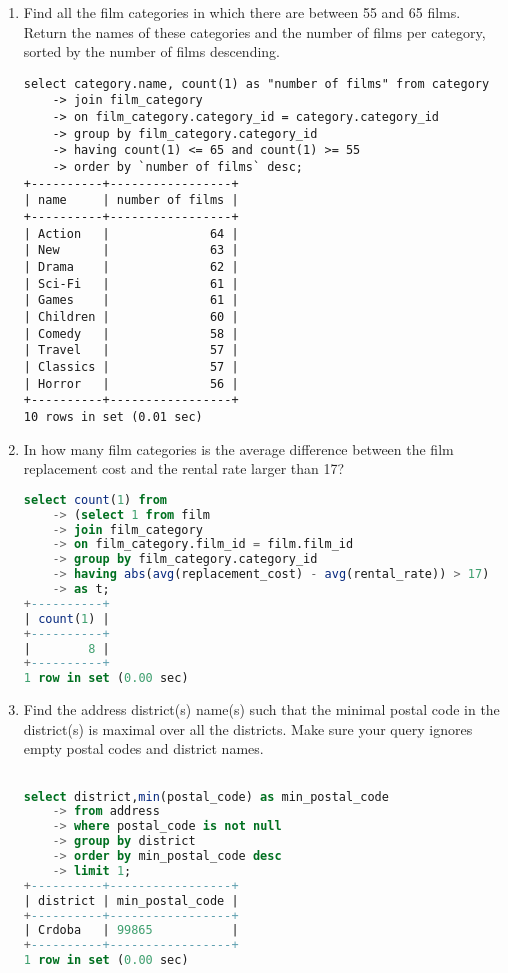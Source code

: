 \documentclass[12pt]{article}
\begin{document}
\begin{enumerate}
\begin{lstlisting}
\end{lstlisting}

\item Find all the film categories in which there are between 55 and 65 films. Return the names of these categories and the number of films per category, sorted by the number of films descending.

\begin{lstlisting}
select category.name, count(1) as "number of films" from category 
    -> join film_category
    -> on film_category.category_id = category.category_id
    -> group by film_category.category_id
    -> having count(1) <= 65 and count(1) >= 55
    -> order by `number of films` desc;
+----------+-----------------+
| name     | number of films |
+----------+-----------------+
| Action   |              64 |
| New      |              63 |
| Drama    |              62 |
| Sci-Fi   |              61 |
| Games    |              61 |
| Children |              60 |
| Comedy   |              58 |
| Travel   |              57 |
| Classics |              57 |
| Horror   |              56 |
+----------+-----------------+
10 rows in set (0.01 sec)

\end{lstlisting}


\item In how many film categories is the average difference between the film replacement cost and the rental rate larger than 17?

\begin{lstlisting}[language=SQL]
select count(1) from
    -> (select 1 from film 
    -> join film_category
    -> on film_category.film_id = film.film_id
    -> group by film_category.category_id
    -> having abs(avg(replacement_cost) - avg(rental_rate)) > 17) 
    -> as t;
+----------+
| count(1) |
+----------+
|        8 |
+----------+
1 row in set (0.00 sec)

\end{lstlisting}


\item Find the address district(s) name(s) such that the minimal postal code in the district(s) is maximal over all the districts. Make sure your query ignores empty postal codes and district names.


\begin{lstlisting}[language=SQL]

select district,min(postal_code) as min_postal_code
    -> from address
    -> where postal_code is not null
    -> group by district
    -> order by min_postal_code desc
    -> limit 1;
+----------+-----------------+
| district | min_postal_code |
+----------+-----------------+
| Crdoba   | 99865           |
+----------+-----------------+
1 row in set (0.00 sec)


\end{lstlisting}
\end{enumerate}
\end{document}
